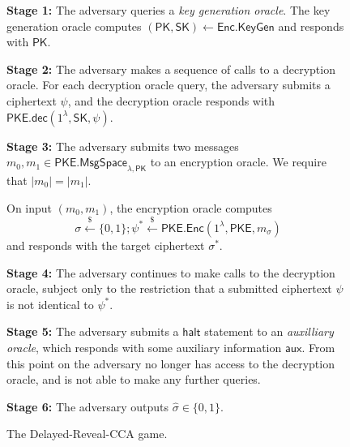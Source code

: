 \documentclass[10pt,a4paper]{article}
\newcommand{\SK}{\mathsf{SK}}
\newcommand{\PK}{\mathsf{PK}}
\newcommand{\rgets}{\xleftarrow{\$}}
\newcommand{\enc}{\mathsf{Enc}}
\newcommand{\keygen}{\mathsf{KeyGen}}
\newcommand{\PKE}{\mathsf{PKE}}
\newcommand{\dec}{\mathsf{dec}}
\begin{document}
	\begin{figure}[ht!]
		\begin{framed}
			\vspace{2mm}
			\textbf{Stage 1:} The adversary queries a \textit{key generation oracle}. The key generation oracle computes $(\PK,\SK)\leftarrow\enc.\keygen$ and responds with $\PK$.
			
			\vspace{2mm}
			
			\textbf{Stage 2:} The adversary makes a sequence of calls to a decryption oracle. For each  decryption oracle query, the adversary submits a ciphertext $\psi$, and the decryption
			oracle responds with $\PKE.\dec(1^\lambda, \SK,\psi)$.
			
			\vspace{2mm}
			
			\textbf{Stage 3:} The adversary submits two messages $m_0, m_1\in\PKE.\mathsf{MsgSpace}_{\lambda,\PK}$ to an encryption oracle. We require that $|m_0| = |m_1|$.
			
			On input $(m_0, m_1)$, the encryption oracle computes $$\sigma\rgets\{0,1\};\psi^{*}\rgets\PKE.\enc(1^\lambda,\PKE,m_\sigma)$$ and responds with the target ciphertext $\sigma^{*}$.
			
			\vspace{2mm}
			
			\textbf{Stage 4:} The adversary continues to make calls to the decryption oracle, subject only to the restriction that a submitted ciphertext $\psi$ is not identical to $\psi^{*}$.
			
			\vspace{2mm}
			
			\textbf{Stage 5:} The adversary submits a $\mathsf{halt}$ statement to an \textit{auxilliary oracle}, which responds with some auxiliary information $\mathsf{aux}$. From this point on the adversary no longer has access to the decryption oracle, and is not able to make any further queries.
			
			\vspace{2mm}
			
			\textbf{Stage 6:} The adversary outputs $\hat{\sigma}\in\{0,1\}$.
			
		\end{framed}
		\caption{The Delayed-Reveal-CCA game.}
		\label{fig:dcca}
	\end{figure}
\end{document}
